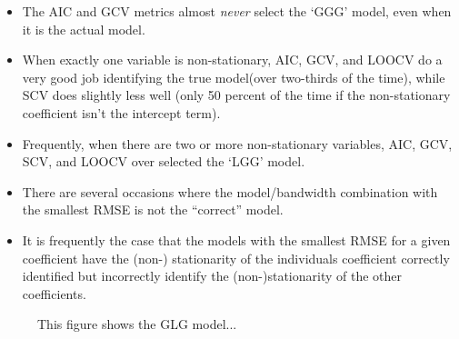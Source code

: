 \documentclass{article}\usepackage[]{graphicx}\usepackage[]{color}
\begin{document}
\begin{itemize}
\item The AIC and GCV metrics almost \emph{never} select the `GGG' model, even when it is the actual model.
\item When exactly one variable is non-stationary, AIC, GCV, and LOOCV do a very good job identifying the true model(over two-thirds of the time), while SCV does slightly less well (only 50 percent of the time if the non-stationary coefficient isn't the intercept term).
\item Frequently, when there are two or more non-stationary variables, AIC, GCV, SCV, and LOOCV over selected the `LGG' model. 
\item There are several occasions where the model/bandwidth combination with the smallest RMSE is not the ``correct'' model.
\item It is frequently the case that the models with the smallest RMSE for a given coefficient have the (non-) stationarity of the individuals coefficient correctly identified but incorrectly identify the (non-)stationarity of the other coefficients.
\end{itemize}








\begin{figure}
\caption{This figure shows the GLG model...}
\label{fig:GLGmodelBandwidths}
\end{figure}
\end{document}

